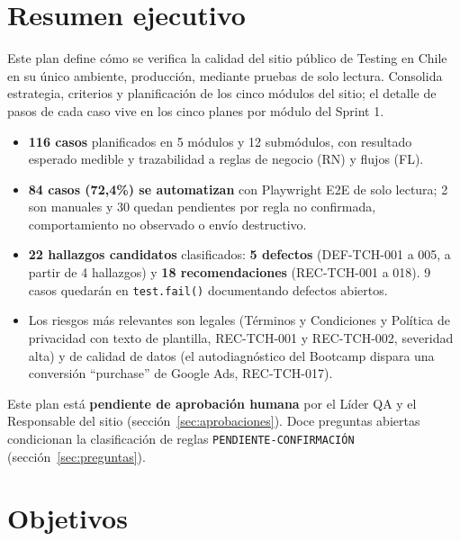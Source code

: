 \documentclass[11pt,a4paper]{article}
\begin{document}
\section{Resumen ejecutivo}

Este plan define cómo se verifica la calidad del sitio público de Testing en Chile
en su único ambiente, producción, mediante pruebas de
solo lectura. Consolida estrategia, criterios y planificación de los cinco módulos del sitio;
el detalle de pasos de cada caso vive en los cinco planes por módulo del Sprint 1.

\begin{itemize}
  \item \textbf{116 casos} planificados en 5 módulos y 12 submódulos, con resultado esperado
        medible y trazabilidad a reglas de negocio (RN) y flujos (FL).
  \item \textbf{84 casos (72{,}4\%) se automatizan} con Playwright E2E de solo lectura;
        2 son manuales y 30 quedan pendientes por regla no confirmada, comportamiento no
        observado o envío destructivo.
  \item \textbf{22 hallazgos candidatos} clasificados: \textbf{5 defectos} (DEF-TCH-001 a 005,
        a partir de 4 hallazgos) y \textbf{18 recomendaciones} (REC-TCH-001 a 018).
        9 casos quedarán en \texttt{test.fail()} documentando defectos abiertos.
  \item Los riesgos más relevantes son legales (Términos y Condiciones y Política de privacidad
        con texto de plantilla, REC-TCH-001 y REC-TCH-002, severidad alta) y de calidad de datos
        (el autodiagnóstico del Bootcamp dispara una conversión ``purchase'' de Google Ads, REC-TCH-017).
\end{itemize}

\begin{warnbox}
Este plan está \textbf{pendiente de aprobación humana} por el Líder QA y el Responsable del sitio
(sección~\ref{sec:aprobaciones}). Doce preguntas abiertas condicionan la clasificación de reglas
\texttt{PENDIENTE-CONFIRMACIÓN} (sección~\ref{sec:preguntas}).
\end{warnbox}

\section{Objetivos}
\end{document}
